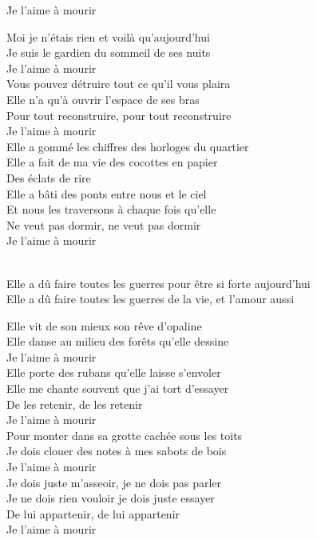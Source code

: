 \documentclass{novel}
\begin{document}
{\vspace{0.05\textheight}
\begin{minipage}[t][0.65\textheight][t]{\textwidth}
\h*{Je l’aime à mourir}
\begin{multicols}{2}
\small
Moi je n'étais rien et voilà qu'aujourd'hui \\
Je suis le gardien du sommeil de ses nuits \\
Je l'aime à mourir \\
Vous pouvez détruire tout ce qu'il vous plaira \\
Elle n'a qu'à ouvrir l'espace de ses bras \\
Pour tout reconstruire, pour tout reconstruire \\
Je l'aime à mourir \\
Elle a gommé les chiffres des horloges du quartier \\
Elle a fait de ma vie des cocottes en papier \\
Des éclats de rire \\
Elle a bâti des ponts entre nous et le ciel \\
Et nous les traversons à chaque fois qu'elle \\
Ne veut pas dormir, ne veut pas dormir \\
Je l'aime à mourir \scriptsize \\

\small
\begin{bfseries}
[Refrain:]\\
Elle a dû faire toutes les guerres pour être si forte aujourd'hui \\
Elle a dû faire toutes les guerres de la vie, et l'amour aussi \\
\end{bfseries}

Elle vit de son mieux son rêve d'opaline \\
Elle danse au milieu des forêts qu'elle dessine \\
Je l'aime à mourir \\
Elle porte des rubans qu'elle laisse s'envoler \\
Elle me chante souvent que j'ai tort d'essayer \\
De les retenir, de les retenir \\
Je l'aime à mourir \\
Pour monter dans sa grotte cachée sous les toits \\
Je dois clouer des notes à mes sabots de bois \\
Je l'aime à mourir \\
Je dois juste m'asseoir, je ne dois pas parler \\
Je ne dois rien vouloir je dois juste essayer \\
De lui appartenir, de lui appartenir \\
Je l'aime à mourir \scriptsize \\


\end{multicols}
\end{minipage}}
\end{document}
